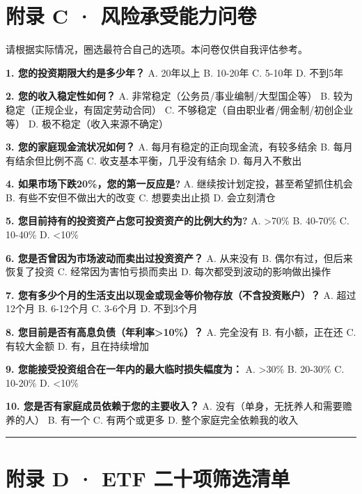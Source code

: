 \documentclass[a4paper,11pt,oneside,fontset=none,UTF8,zihao=-4]{ctexbook}
\begin{document}
\section{附录 C ·
风险承受能力问卷}\label{ux9644ux5f55-c-ux98ceux9669ux627fux53d7ux80fdux529bux95eeux5377}

请根据实际情况，圈选最符合自己的选项。本问卷仅供自我评估参考。

\textbf{1. 您的投资期限大约是多少年？} A. 20年以上 B. 10-20年 C. 5-10年
D. 不到5年

\textbf{2. 您的收入稳定性如何？} A.
非常稳定（公务员/事业编制/大型国企等） B.
较为稳定（正规企业，有固定劳动合同） C.
不够稳定（自由职业者/佣金制/初创企业等） D. 极不稳定（收入来源不确定）

\textbf{3. 您的家庭现金流状况如何？} A.
每月有稳定的正向现金流，有较多结余 B. 每月有结余但比例不高 C.
收支基本平衡，几乎没有结余 D. 每月入不敷出

\textbf{4. 如果市场下跌20\%，您的第一反应是?} A.
继续按计划定投，甚至希望抓住机会 B. 有些不安但不做出大的改变 C.
想要卖出止损 D. 会立刻清仓

\textbf{5. 您目前持有的投资资产占您可投资资产的比例大约为?} A.
\textgreater70\% B. 40-70\% C. 10-40\% D. \textless10\%

\textbf{6. 您是否曾因为市场波动而卖出过投资资产？} A. 从来没有 B.
偶尔有过，但后来恢复了投资 C. 经常因为害怕亏损而卖出 D.
每次都受到波动的影响做出操作

\textbf{7.
您有多少个月的生活支出以现金或现金等价物存放（不含投资账户）？} A.
超过12个月 B. 6-12个月 C. 3-6个月 D. 不到3个月

\textbf{8. 您目前是否有高息负债（年利率\textgreater10\%）？} A. 完全没有
B. 有小额，正在还 C. 有较大金额 D. 有，且在持续增加

\textbf{9. 您能接受投资组合在一年内的最大临时损失幅度为：} A.
\textgreater30\% B. 20-30\% C. 10-20\% D. \textless10\%

\textbf{10. 您是否有家庭成员依赖于您的主要收入？} A.
没有（单身，无抚养人和需要赡养的人） B. 有一个 C. 有两个或更多 D.
整个家庭完全依赖我的收入

\begin{center}{\color{dh-bronze}\rule{0.2\textwidth}{0.5pt}}\end{center}

\section{附录 D · ETF
二十项筛选清单}\label{ux9644ux5f55-d-etf-ux4e8cux5341ux9879ux7b5bux9009ux6e05ux5355}
\end{document}
